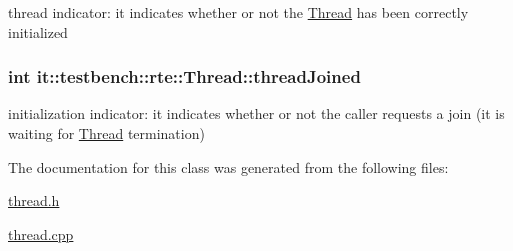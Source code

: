 thread indicator\-: it indicates whether or not the \hyperlink{classit_1_1testbench_1_1rte_1_1Thread}{Thread} has been correctly initialized \hypertarget{classit_1_1testbench_1_1rte_1_1Thread_af5a9dd2c81470f0c41113f461bc91ed0}{
\subsubsection[{thread\-Joined}]{\setlength{\rightskip}{0pt plus 5cm}int it\-::testbench\-::rte\-::\-Thread\-::thread\-Joined\hspace{0.3cm}{\ttfamily [protected]}}}\label{df/df6/classit_1_1testbench_1_1rte_1_1Thread_af5a9dd2c81470f0c41113f461bc91ed0}
initialization indicator\-: it indicates whether or not the caller requests a join (it is waiting for \hyperlink{classit_1_1testbench_1_1rte_1_1Thread}{Thread} termination) 

The documentation for this class was generated from the following files\-:\begin{DoxyCompactItemize}
\item 
\hyperlink{thread_8h}{thread.\-h}\item 
\hyperlink{thread_8cpp}{thread.\-cpp}\end{DoxyCompactItemize}
